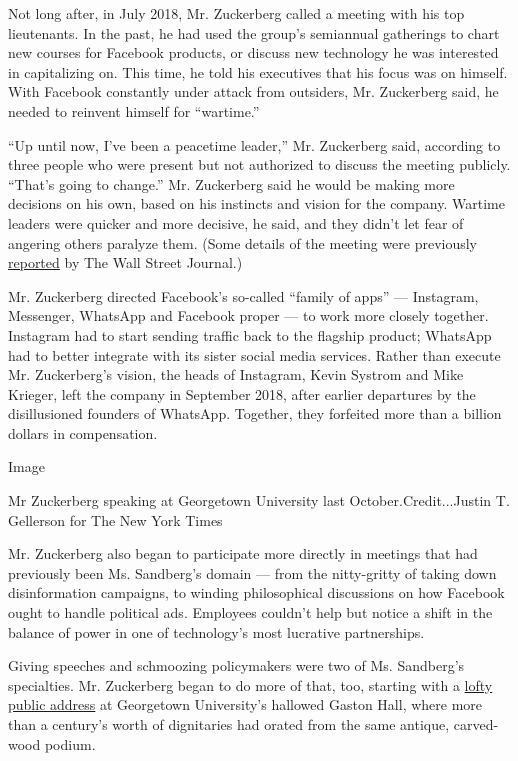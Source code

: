 Not long after, in July 2018, Mr. Zuckerberg called a meeting with his
top lieutenants. In the past, he had used the group's semiannual
gatherings to chart new courses for Facebook products, or discuss new
technology he was interested in capitalizing on. This time, he told his
executives that his focus was on himself. With Facebook constantly under
attack from outsiders, Mr. Zuckerberg said, he needed to reinvent
himself for ``wartime.''

``Up until now, I've been a peacetime leader,'' Mr. Zuckerberg said,
according to three people who were present but not authorized to discuss
the meeting publicly. ``That's going to change.'' Mr. Zuckerberg said he
would be making more decisions on his own, based on his instincts and
vision for the company. Wartime leaders were quicker and more decisive,
he said, and they didn't let fear of angering others paralyze them.
(Some details of the meeting were previously
\href{https://www.wsj.com/articles/with-facebook-at-war-zuckerberg-adopts-more-aggressive-style-1542577980}{reported}
by The Wall Street Journal.)

Mr. Zuckerberg directed Facebook's so-called ``family of apps'' ---
Instagram, Messenger, WhatsApp and Facebook proper --- to work more
closely together. Instagram had to start sending traffic back to the
flagship product; WhatsApp had to better integrate with its sister
social media services. Rather than execute Mr. Zuckerberg's vision, the
heads of Instagram, Kevin Systrom and Mike Krieger, left the company in
September 2018, after earlier departures by the disillusioned founders
of WhatsApp. Together, they forfeited more than a billion dollars in
compensation.

Image

Mr Zuckerberg speaking at Georgetown University last
October.Credit...Justin T. Gellerson for The New York Times

Mr. Zuckerberg also began to participate more directly in meetings that
had previously been Ms. Sandberg's domain --- from the nitty-gritty of
taking down disinformation campaigns, to winding philosophical
discussions on how Facebook ought to handle political ads. Employees
couldn't help but notice a shift in the balance of power in one of
technology's most lucrative partnerships.

Giving speeches and schmoozing policymakers were two of Ms. Sandberg's
specialties. Mr. Zuckerberg began to do more of that, too, starting with
a
\href{https://www.nytimes3xbfgragh.onion/2019/10/17/business/zuckerberg-facebook-free-speech.html}{lofty
public address} at Georgetown University's hallowed Gaston Hall, where
more than a century's worth of dignitaries had orated from the same
antique, carved-wood podium.

